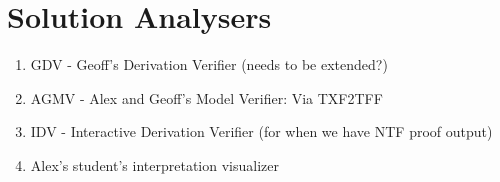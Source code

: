 \documentclass[runningheads]{llncs}
\begin{document}
\section{Solution Analysers}
\label{SolutionAnalysers}

      \begin{enumerate}
      \item GDV - Geoff's Derivation Verifier (needs to be extended?)
      \item AGMV - Alex and Geoff's Model Verifier: Via TXF2TFF
      \item IDV - Interactive Derivation Verifier (for when we have NTF proof output)
      \item Alex's student's interpretation visualizer
      \end{enumerate}


\end{document}
